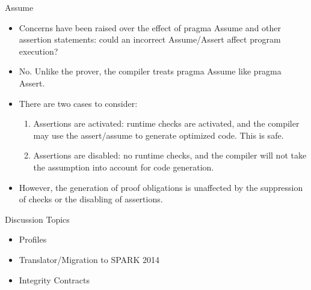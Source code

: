\documentclass{beamer}
\begin{document}
\begin{frame}{Assume}

  \begin{itemize}

  \item Concerns have been raised over the effect of pragma Assume and other assertion statements: could an incorrect Assume/Assert affect program execution?

  \item No. Unlike the prover, the compiler treats pragma Assume like pragma Assert.

  \item There are two cases to consider:
  \begin{enumerate}
    \item Assertions are activated: runtime checks are activated, and the compiler may use the assert/assume to generate optimized code. This is safe.
    \item Assertions are disabled: no runtime checks, and the compiler will not take the assumption into account for code generation.
  \end{enumerate}

  \item However, the generation of proof obligations is unaffected by the suppression of checks or the disabling of assertions.

  \end{itemize}

\end{frame}

\begin{frame}{Discussion Topics}

  \begin{itemize}

  \item Profiles
  \item Translator/Migration to SPARK 2014
  \item Integrity Contracts

  \end{itemize}

\end{frame}
\end{document}

